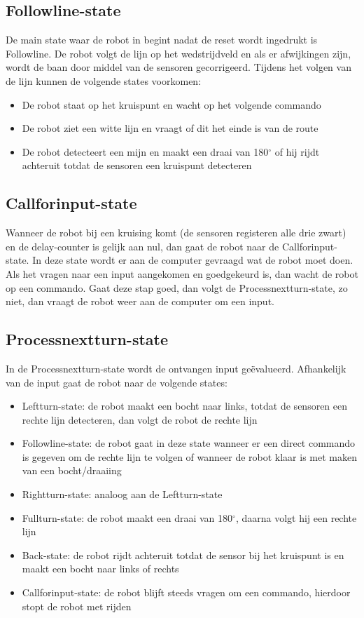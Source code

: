\documentclass{report}
\begin{document}
\subsection{Followline-state}
De main state waar de robot in begint nadat de reset wordt ingedrukt is Followline.
De robot volgt de lijn op het wedstrijdveld en als er afwijkingen zijn, wordt de baan door middel van de sensoren gecorrigeerd.
Tijdens het volgen van de lijn kunnen de volgende states voorkomen: 
\begin{itemize}
\item De robot staat op het kruispunt en wacht op het volgende commando
\item De robot ziet een witte lijn en vraagt of dit het einde is van de route
\item De robot detecteert een mijn en maakt een draai van 180$^\circ$ of hij rijdt achteruit totdat de sensoren een kruispunt detecteren
\end{itemize}

\subsection{Callforinput-state}
Wanneer de robot bij een kruising komt (de sensoren registeren alle drie zwart) en de delay-counter is gelijk aan nul, dan gaat de robot naar de Callforinput-state.
In deze state wordt er aan de computer gevraagd wat de robot moet doen.
Als het vragen naar een input aangekomen en goedgekeurd is, dan wacht de robot op een commando.
Gaat deze stap goed, dan volgt de Processnextturn-state, zo niet, dan vraagt de robot weer aan de computer om een input.

\subsection{Processnextturn-state}
In de Processnextturn-state wordt de ontvangen input ge\"{e}valueerd.
Afhankelijk van de input gaat de robot naar de volgende states:
\begin{itemize}
\item Leftturn-state: de robot maakt een bocht naar links, totdat de sensoren een rechte lijn detecteren, dan volgt de robot de rechte lijn
\item Followline-state: de robot gaat in deze state wanneer er een direct commando is gegeven om de rechte lijn te volgen of wanneer de robot klaar is met maken van een bocht/draaiing
\item Rightturn-state: analoog aan de Leftturn-state
\item Fullturn-state: de robot maakt een draai van 180$^\circ$, daarna volgt hij een rechte lijn
\item Back-state: de robot rijdt achteruit totdat de sensor bij het kruispunt is en maakt een bocht naar links of rechts
\item Callforinput-state: de robot blijft steeds vragen om een commando, hierdoor stopt de robot met rijden
\end{itemize} 
\end{document}

